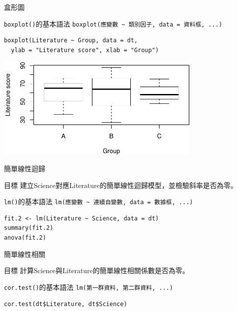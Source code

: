 \documentclass[12pt, aspectratio=43]{beamer}
\begin{document}
\begin{frame}[fragile]{盒形圖}

\begin{block}{\texttt{boxplot()}的基本語法}
\verb+boxplot(應變數 ~ 類別因子, data = 資料框, ...)+
\end{block}

\begin{verbatim}
boxplot(Literature ~ Group, data = dt, 
  ylab = "Literature score", xlab = "Group")
\end{verbatim}

\begin{center}
\includegraphics[width=0.75\textwidth]{Rplot-three-group.pdf}
\end{center}
\end{frame}

%


\begin{frame}[fragile]{簡單線性迴歸}
\begin{block}{目標}
建立Science對應Literature的簡單線性迴歸模型，並檢驗斜率是否為零。
\end{block}
\begin{block}{\texttt{lm()}的基本語法}
\verb+lm(應變數 ~ 連續自變數, data = 數據框, ...)+
\end{block}
\begin{verbatim}
fit.2 <- lm(Literature ~ Science, data = dt)
summary(fit.2)
anova(fit.2)
\end{verbatim}
\end{frame}


\begin{frame}[fragile]{簡單線性相關}
\begin{block}{目標}
計算Science與Literature的簡單線性相關係數是否為零。
\end{block}
\begin{block}{\texttt{cor.test()}的基本語法}
\verb+lm(第一群資料, 第二群資料, ...)+
\end{block}
\begin{verbatim}
cor.test(dt$Literature, dt$Science)
\end{verbatim}
\end{frame}
\end{document}
